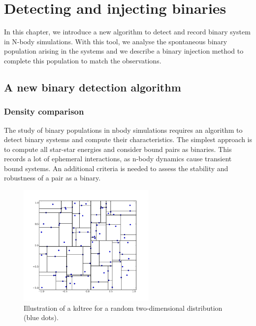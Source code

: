 
\chapter{Detecting and injecting binaries}


In this chapter, we introduce a new algorithm to detect and record binary system in N-body simulations. With this tool, we analyse the spontaneous binary population arising in the \HubLem systems and we describe a binary injection method to complete this population to match the observations.


\minitoc

\section{A new binary detection algorithm}


\subsection{Density comparison}

The study of binary populations in nbody simulations requires an algorithm to detect binary systems and compute their characteristics. The simplest approach is to compute all star-star energies and consider bound pairs as binaries. This records a lot of ephemeral interactions, as n-body dynamics cause transient bound systems. An additional criteria is needed to assess the stability and robustness of a pair as a binary.

\begin{figure}
\begin{center}
\includegraphics[width=0.6\textwidth]{Figures/5_kdtree}
\caption{Illustration of a kdtree for a random two-dimensional distribution (blue dots).}
\label{Fig:5_kdtree}
\end{center}
\end{figure}


